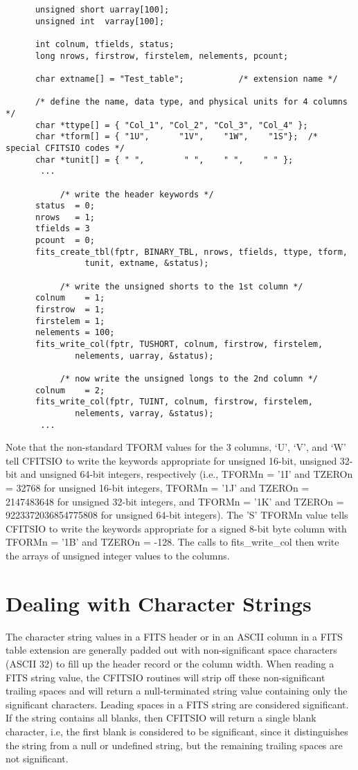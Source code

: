 \documentclass[11pt]{book}
\begin{document}
\begin{verbatim}
      unsigned short uarray[100];
      unsigned int  varray[100];

      int colnum, tfields, status;
      long nrows, firstrow, firstelem, nelements, pcount;

      char extname[] = "Test_table";           /* extension name */

      /* define the name, data type, and physical units for 4 columns */
      char *ttype[] = { "Col_1", "Col_2", "Col_3", "Col_4" };
      char *tform[] = { "1U",      "1V",    "1W",    "1S"};  /* special CFITSIO codes */
      char *tunit[] = { " ",        " ",    " ",    " " };
       ...

           /* write the header keywords */
      status  = 0;
      nrows   = 1;
      tfields = 3
      pcount  = 0;
      fits_create_tbl(fptr, BINARY_TBL, nrows, tfields, ttype, tform,
                tunit, extname, &status);

           /* write the unsigned shorts to the 1st column */
      colnum    = 1;
      firstrow  = 1;
      firstelem = 1;
      nelements = 100;
      fits_write_col(fptr, TUSHORT, colnum, firstrow, firstelem,
              nelements, uarray, &status);

           /* now write the unsigned longs to the 2nd column */
      colnum    = 2;
      fits_write_col(fptr, TUINT, colnum, firstrow, firstelem,
              nelements, varray, &status);
       ...
\end{verbatim}
Note that the non-standard TFORM values for the 3 columns, `U', `V', and `W'
tell CFITSIO to write the keywords appropriate for unsigned 16-bit, unsigned 32-bit and
unsigned 64-bit integers, respectively (i.e., TFORMn = '1I' and TZEROn
= 32768 for unsigned 16-bit integers, TFORMn = '1J' and TZEROn =
2147483648 for unsigned 32-bit integers, and TFORMn = '1K' and TZEROn =
9223372036854775808 for unsigned 64-bit integers).  The 'S' TFORMn value tells
CFITSIO to write the keywords appropriate for a signed 8-bit byte column
with TFORMn = '1B' and TZEROn = -128.  The calls to fits\_write\_col
then write the arrays of unsigned integer values to the columns.


\section{Dealing with Character Strings \label{character-strings}}

The character string values in a FITS header or in an ASCII column in a
FITS table extension are generally padded out with non-significant
space characters (ASCII 32) to fill up the header record or the column
width.  When reading a FITS string value, the CFITSIO routines will
strip off these non-significant trailing spaces and will return a
null-terminated string value containing only the significant
characters.  Leading spaces in a FITS string are considered
significant.  If the string contains all blanks, then CFITSIO will
return a single blank character, i.e, the first blank is considered to
be significant, since it distinguishes the string from a null or
undefined string, but the remaining trailing spaces are not
significant.
\end{document}
